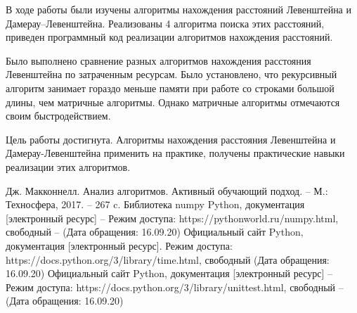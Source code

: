 \documentclass[12pt]{report}
\begin{document}
В ходе работы были изучены алгоритмы нахождения расстояний Левенштейна и Дамерау–Левенштейна. Реализованы 4 алгоритма поиска этих расстояний, приведен программный код реализации алгоритмов нахождения расстояний.

Было выполнено сравнение разных алгоритмов нахождения расстояния Левенштейна по затраченным ресурсам. Было установлено, что рекурсивный алгоритм занимает гораздо меньше памяти при работе со строками большой длины, чем матричные алгоритмы. Однако матричные алгоритмы отмечаются своим быстродействием.

Цель работы достигнута. Алгоритмы нахождения расстояния Левенштейна и Дамерау-Левенштейна применить на практике, получены практические навыки реализации этих алгоритмов.


\begin{thebibliography}{2}
	 Дж. Макконнелл. Анализ алгоритмов. Активный обучающий подход. –	М.: Техносфера, 2017. – 267 c. 
	 Библиотека numpy Python, документация [электронный ресурс] – Режим доступа: https://pythonworld.ru/numpy.html, свободный – (Дата обращения: 16.09.20)
	 Официальный сайт Python, документация [электронный ресурс]. Режим доступа: https://docs.python.org/3/library/time.html, свободный (Дата обращения: 16.09.20)
	 Официальный сайт Python, документация [электронный ресурс] – Режим доступа: https://docs.python.org/3/library/unittest.html, свободный – (Дата обращения: 16.09.20)
\end{thebibliography}
\end{document}
